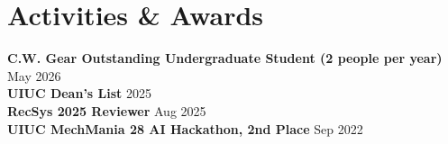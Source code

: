 \section{Activities \& Awards}
 \begin{itemize}[leftmargin=0.15in, label={}]
    \small{\item{
        \textbf{C.W. Gear Outstanding Undergraduate Student (2 people per year)} \hfill May 2026\\
        \textbf{UIUC Dean's List} \hfill 2025 \\
        \textbf{RecSys 2025 Reviewer} \hfill Aug 2025 \\
        \textbf{UIUC MechMania 28 AI Hackathon, 2nd Place} \hfill Sep 2022 \\
    }}
 \end{itemize}
